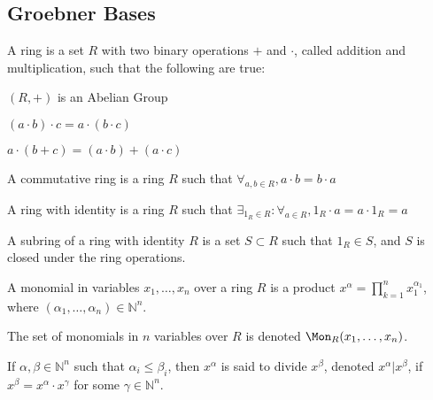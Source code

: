         \subsection{Groebner Bases}
            \begin{definition}
                A ring is a set $R$ with two binary operations $+$
                and $\cdot$, called addition and multiplication,
                such that the following are true:
                \begin{enumerate}
                    \begin{multicols}{3}
                        \item $(R,+)$ is an Abelian Group
                        \item $(a\cdot{b})\cdot{c}=a\cdot(b\cdot{c})$
                        \item $a\cdot(b+c)=(a\cdot b)+(a\cdot c)$
                    \end{multicols}
                \end{enumerate}
            \end{definition}
            \begin{definition}
                A commutative ring is a ring $R$ such that
                $\forall_{a,b\in R},a\cdot{b}=b\cdot{a}$
            \end{definition}
            \begin{definition}
                A ring with identity is a ring $R$ such that
                $\exists_{1_{R}\in R}:\forall_{a\in R}, 1_{R}\cdot a=a\cdot 1_{R}=a$
            \end{definition}
            \begin{definition}
                A subring of a ring with identity $R$ is a set
                $S\subset R$ such that $1_{R}\in S$, and $S$ is
                closed under the ring operations.
            \end{definition}
            \begin{definition}
                A monomial in variables $x_1,\hdots, x_n$ over a
                ring $R$ is a product
                $x^\alpha=\prod_{k=1}^{n} x_1^{\alpha_1}$,
                where $(\alpha_1,\hdots,\alpha_n)\in \mathbb{N}^n$.
            \end{definition}
            The set of monomials in $n$ variables over $R$ is denoted
            $\Mon_{R}(x_1,\hdots, x_n)$.
            \begin{definition}
                If $\alpha,\beta \in \mathbb{N}^n$ such that
                $\alpha_i \leq \beta_i$, then $x^{\alpha}$ is said
                to divide $x^\beta$, denoted $x^\alpha \vert x^\beta$,
                if $x^\beta = x^\alpha \cdot x^\gamma$ for some
                $\gamma\in\mathbb{N}^n$.
            \end{definition}

